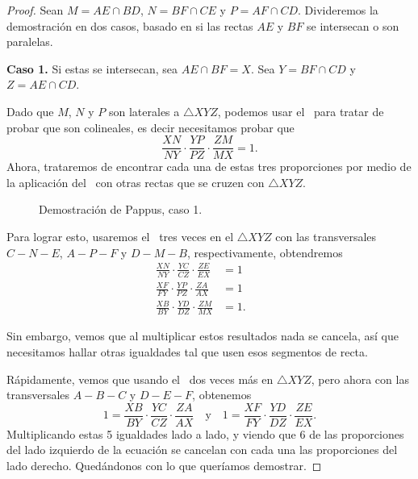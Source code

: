 \begin{proof}
    Sean $M = AE \cap BD$, $N = BF \cap CE$ y $P = AF \cap CD$.
    Divideremos la demostración en dos casos, basado en si las rectas $AE$ y $BF$ se intersecan o son paralelas.
    
    \textbf{Caso 1.}
    Si estas se intersecan, sea $AE \cap BF = X$.
    Sea $Y = BF \cap CD$ y $Z = AE \cap CD$.

    Dado que $M$, $N$ y $P$ son laterales a $\triangle XYZ$, podemos usar el~ para tratar de probar que son colineales, es decir necesitamos probar que
    \[
        \frac{XN}{NY} \cdot \frac{YP}{PZ} \cdot \frac{ZM}{MX} = 1.
    \]
    Ahora, trataremos de encontrar cada una de estas tres proporciones por medio de la aplicación del~ con otras rectas que se cruzen con $\triangle XYZ$.

    \begin{multicols}{2}
        \begin{figure}[H]
            \centering
            
            \caption{Demostración de Pappus, caso 1.}
        \end{figure}
        Para lograr esto, usaremos el~ tres veces en el $\triangle XYZ$ con las transversales $C - N - E$, $A - P - F$ y $D - M - B$, respectivamente, obtendremos
        \begin{align*}
            \frac{XN}{NY} \cdot \frac{YC}{CZ} \cdot \frac{ZE}{EX} &= 1 &&\\[2mm]
            \frac{XF}{FY} \cdot \frac{YP}{PZ} \cdot \frac{ZA}{AX} &= 1 &&\\[2mm]
            \frac{XB}{BY} \cdot \frac{YD}{DZ} \cdot \frac{ZM}{MX} &= 1.
        \end{align*}
    \end{multicols}
    Sin embargo, vemos que al multiplicar estos resultados nada se cancela, así que necesitamos hallar otras igualdades tal que usen esos segmentos de recta.

    Rápidamente, vemos que usando el~ dos veces más en $\triangle XYZ$, pero ahora con las transversales $A - B - C$ y $D - E - F$, obtenemos
    \[
        1 = \frac{XB}{BY} \cdot \frac{YC}{CZ} \cdot \frac{ZA}{AX} \quad \text{y} \quad 1 = \frac{XF}{FY} \cdot \frac{YD}{DZ} \cdot \frac{ZE}{EX}.
    \]
    Multiplicando estas 5 igualdades lado a lado, y viendo que 6 de las proporciones del lado izquierdo de la ecuación se cancelan con cada una las proporciones del lado derecho.
    Quedándonos con lo que queríamos demostrar.



\end{proof}

